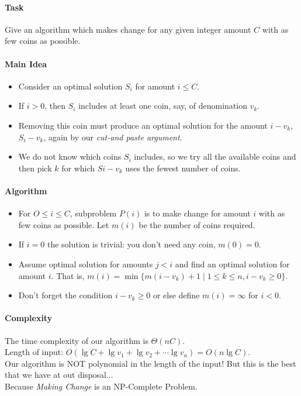 \paragraph{Task}
Give an algorithm which makes change for any given integer amount \(C\) with as few coins as possible.

\paragraph{Main Idea}
\begin{itemize}
    \item Consider an optimal solution \(S_i\) for amount \(i \leq C\).
    \item If \(i > 0\), then \(S_i\) includes at least one coin, say, of denomination \(v_k\).
    \item Removing this coin must produce an optimal solution for the amount \(i - v_k\), \(S_i - v_k\), again by our \textit{cut-and paste argument}.
    \item We do not know which coins \(S_i\) includes, so we try all the available coins and then pick \(k\) for which \(S{i - v_k}\) uses the fewest number of coins.
\end{itemize}

\paragraph{Algorithm}
\begin{itemize}
    \item For \(O \leq i \leq C\), subproblem \(P(i)\) is to make change for amount \(i\) with as few coins as possible. Let \(m(i)\) be the number of coins required.
    \item If \(i=0\) the solution is trivial: you don't need any coin, \(m(0) = 0\).
    \item Assume optimal solution for amounts \(j < i\) and find an optimal solution for amount \(i\). That is, \(m(i) = \min\{m(i - v_k) + 1 \mid 1 \leq k \leq n, i - v_k \geq 0\}\).
    \item Don't forget the condition \(i - v_k \geq 0\) or else define \(m(i) = \infty\) for \(i < 0\).
\end{itemize}

\paragraph{Complexity}
The time complexity of our algorithm is \(\Theta(nC)\).\\
Length of input: \(O(\lg C + \lg v_1 + \lg v_2 + \cdots \lg v_n) = O(n\lg C)\). \\
Our algorithm is NOT polynomial in the length of the input! But this is the best that we have at out disposal...\\
Because \textit{Making Change} is an NP-Complete Problem.

